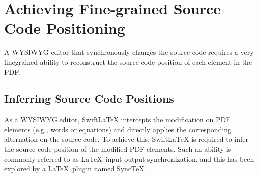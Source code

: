 \documentclass[sigconf]{acmart}
\begin{document}











\section{Achieving Fine-grained Source Code Positioning}  \label{sect:textpos}
A WYSIWYG editor that synchronously changes the source code  requires a very finegrained ability to reconstruct the source code position of each element in the PDF.

\subsection{Inferring Source Code Positions}
As a WYSIWYG editor, SwiftLaTeX intercepts the modification on PDF elements (e.g., words or equations) and directly applies the corresponding alternation on the source code. To achieve this, SwiftLaTeX is required to infer the source code position of the modified PDF elements. 
Such an ability is commonly referred to as \LaTeX\ input-output synchronization, and this has been explored by a \LaTeX\ plugin named Sync\TeX. 
\end{document}
